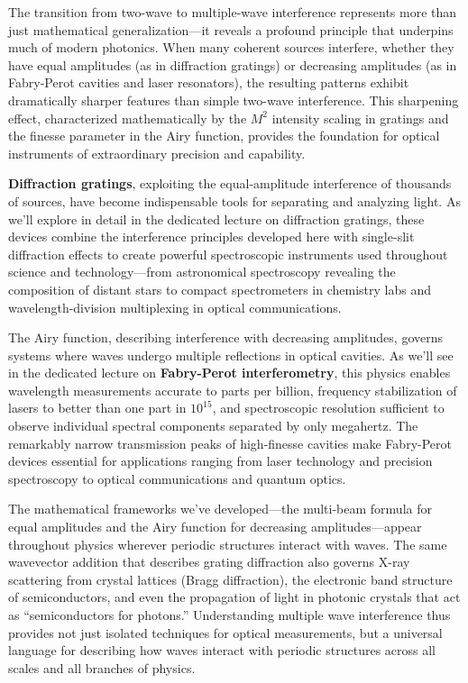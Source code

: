 \documentclass[
  a4paper,
]{book}
\begin{document}
The transition from two-wave to multiple-wave interference represents
more than just mathematical generalization---it reveals a profound
principle that underpins much of modern photonics. When many coherent
sources interfere, whether they have equal amplitudes (as in diffraction
gratings) or decreasing amplitudes (as in Fabry-Perot cavities and laser
resonators), the resulting patterns exhibit dramatically sharper
features than simple two-wave interference. This sharpening effect,
characterized mathematically by the \(M^2\) intensity scaling in
gratings and the finesse parameter in the Airy function, provides the
foundation for optical instruments of extraordinary precision and
capability.

\textbf{Diffraction gratings}, exploiting the equal-amplitude
interference of thousands of sources, have become indispensable tools
for separating and analyzing light. As we'll explore in detail in the
dedicated lecture on diffraction gratings, these devices combine the
interference principles developed here with single-slit diffraction
effects to create powerful spectroscopic instruments used throughout
science and technology---from astronomical spectroscopy revealing the
composition of distant stars to compact spectrometers in chemistry labs
and wavelength-division multiplexing in optical communications.

The Airy function, describing interference with decreasing amplitudes,
governs systems where waves undergo multiple reflections in optical
cavities. As we'll see in the dedicated lecture on \textbf{Fabry-Perot
interferometry}, this physics enables wavelength measurements accurate
to parts per billion, frequency stabilization of lasers to better than
one part in \(10^{15}\), and spectroscopic resolution sufficient to
observe individual spectral components separated by only megahertz. The
remarkably narrow transmission peaks of high-finesse cavities make
Fabry-Perot devices essential for applications ranging from laser
technology and precision spectroscopy to optical communications and
quantum optics.

The mathematical frameworks we've developed---the multi-beam formula for
equal amplitudes and the Airy function for decreasing
amplitudes---appear throughout physics wherever periodic structures
interact with waves. The same wavevector addition that describes grating
diffraction also governs X-ray scattering from crystal lattices (Bragg
diffraction), the electronic band structure of semiconductors, and even
the propagation of light in photonic crystals that act as
``semiconductors for photons.'' Understanding multiple wave interference
thus provides not just isolated techniques for optical measurements, but
a universal language for describing how waves interact with periodic
structures across all scales and all branches of physics.
\end{document}
